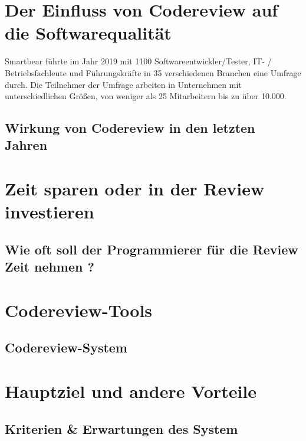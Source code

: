 \section{Der Einfluss von Codereview auf die Softwarequalität}
\label{sec:rEinfluss}
\label{subsec:Ziel}
Smartbear \cite{smartbear} führte im Jahr 2019 mit 1100 Softwareentwickler/Tester, IT- / Betriebsfachleute und Führungskräfte in 35 verschiedenen Branchen eine Umfrage durch. Die Teilnehmer der Umfrage arbeiten in Unternehmen mit unterschiedlichen Größen, von weniger als 25 Mitarbeitern bis zu über 10.000.

\subsection{Wirkung von Codereview in den letzten Jahren}
\label{subsec:rWirkung}

\section{Zeit sparen oder in der Review investieren}
\label{sec:rZeitIstWert}
\label{sec:reviewZeit}

\subsection{Wie oft soll der Programmierer für die Review Zeit nehmen ?}
\label{subsec:reviewerZeit}

\section{Codereview-Tools}
\label{sec:Coderview-Tools}


\subsection{Codereview-System}
\label{subsec:CRS}

\section{Hauptziel und andere Vorteile}
\label{sec:Ziel}

\subsection{Kriterien \& Erwartungen des System}
\label{sec:kriterien}
